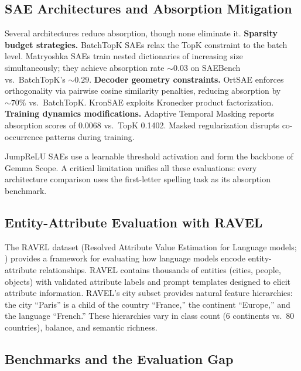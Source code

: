 \documentclass{article}
\begin{document}
\subsection{SAE Architectures and Absorption Mitigation}

Several architectures reduce absorption, though none eliminate it. \textbf{Sparsity budget strategies.} BatchTopK SAEs \citep{rajamanoharan2024batchtopk} relax the TopK constraint to the batch level. Matryoshka SAEs \citep{bussmann2025matryoshka} train nested dictionaries of increasing size simultaneously; they achieve absorption rate ${\sim}0.03$ on SAEBench vs.\ BatchTopK's ${\sim}0.29$. \textbf{Decoder geometry constraints.} OrtSAE \citep{korznikov2025ortsae} enforces orthogonality via pairwise cosine similarity penalties, reducing absorption by ${\sim}70\%$ vs.\ BatchTopK. KronSAE \citep{yun2025kronsae} exploits Kronecker product factorization. \textbf{Training dynamics modifications.} Adaptive Temporal Masking \citep{li2025atm} reports absorption scores of 0.0068 vs.\ TopK 0.1402. Masked regularization \citep{narayanaswamy2026masked} disrupts co-occurrence patterns during training.

JumpReLU SAEs \citep{rajamanoharan2024jumprelu} use a learnable threshold activation and form the backbone of Gemma Scope. A critical limitation unifies all these evaluations: every architecture comparison uses the first-letter spelling task as its absorption benchmark.

\subsection{Entity-Attribute Evaluation with RAVEL}

The RAVEL dataset (Resolved Attribute Value Estimation for Language models; \citealp{huang2024ravel}) provides a framework for evaluating how language models encode entity-attribute relationships. RAVEL contains thousands of entities (cities, people, objects) with validated attribute labels and prompt templates designed to elicit attribute information. RAVEL's city subset provides natural feature hierarchies: the city ``Paris'' is a child of the country ``France,'' the continent ``Europe,'' and the language ``French.'' These hierarchies vary in class count (6 continents vs.\ 80 countries), balance, and semantic richness.

\subsection{Benchmarks and the Evaluation Gap}
\end{document}
